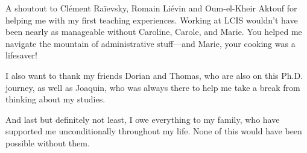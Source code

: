 A shoutout to Clément Raïevsky, Romain Liévin and Oum-el-Kheir Aktouf for helping me with my first teaching experiences. Working at LCIS wouldn’t have been nearly as manageable without Caroline, Carole, and Marie. You helped me navigate the mountain of administrative stuff—and Marie, your cooking was a lifesaver!

I also want to thank my friends Dorian and Thomas, who are also on this Ph.D. journey, as well as Joaquin, who was always there to help me take a break from thinking about my studies.

And last but definitely not least, I owe everything to my family, who have supported me unconditionally throughout my life. None of this would have been possible without them.


\endgroup



